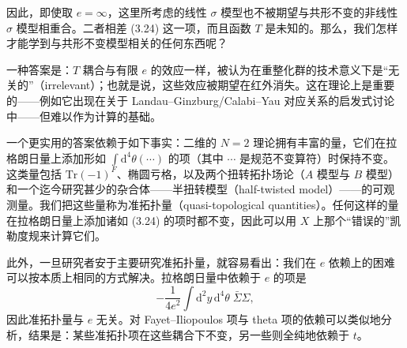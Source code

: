 
因此，即使取 $e=\infty$，这里所考虑的线性 $\sigma$ 模型也不被期望与共形不变的非线性 $\sigma$ 模型相重合。二者相差 (3.24) 这一项，而且函数 $T$ 是未知的。那么，我们怎样才能学到与共形不变模型相关的任何东西呢？

一种答案是：$T$ 耦合与有限 $e$ 的效应一样，被认为在重整化群的技术意义下是“无关的”（irrelevant）；也就是说，这些效应被期望在红外消失。这在理论上是重要的——例如它出现在关于 Landau--Ginzburg/Calabi--Yau 对应关系的启发式讨论中——但难以作为计算的基础。

一个更实用的答案依赖于如下事实：二维的 $N=2$ 理论拥有丰富的量，它们在拉格朗日量上添加形如 $\int \mathrm{d}^{4}\theta(\cdots)$ 的项（其中 $\cdots$ 是规范不变算符）时保持不变。这类量包括 $\mathrm{Tr}(-1)^{F}$、椭圆亏格，以及两个扭转拓扑场论（$A$ 模型与 $B$ 模型）和一个迄今研究甚少的杂合体——半扭转模型（half-twisted model）——的可观测量。我们把这些量称为准拓扑量（quasi-topological quantities）。任何这样的量在拉格朗日量上添加诸如 (3.24) 的项时都不变，因此可以用 $X$ 上那个“错误的”凯勒度规来计算它们。

\label{op:31}
此外，一旦研究者安于主要研究准拓扑量，就容易看出：我们在 $e$ 依赖上的困难可以按本质上相同的方式解决。拉格朗日量中依赖于 $e$ 的项是
\begin{equation}
\tag{3.25}
-\frac{1}{4e^{2}}\int \mathrm{d}^{2}y\,\mathrm{d}^{4}\theta\; \bar\Sigma\Sigma,
\end{equation}
因此准拓扑量与 $e$ 无关。对 Fayet--Iliopoulos 项与 theta 项的依赖可以类似地分析，结果是：某些准拓扑项在这些耦合下不变，另一些则全纯地依赖于 $t$。

